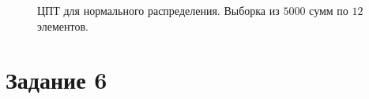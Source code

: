 \documentclass[12pt, a4paper]{article}
\begin{document}
\begin{figure}[H]
\caption{ЦПТ для нормального распределения. Выборка из $5000$ сумм по $12$ элементов.}
\end{figure}

\newpage 

\section{Задание 6}
\end{document}
